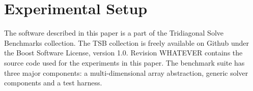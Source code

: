 \documentclass{sig-alternate-05-2015}
\begin{document}
%
%
%
%

\section{Experimental Setup}
\label{sec:experimental_setup:}
The software described in this paper is a part of the Tridiagonal Solve
Benchmarks collection. The TSB collection is freely available on Github under
the Boost Software License, version 1.0. Revision WHATEVER contains the source
code used for the experiments in this paper. The benchmark suite has three
major components: a multi-dimensional array abstraction, generic solver
components and a test harness.
\end{document}
